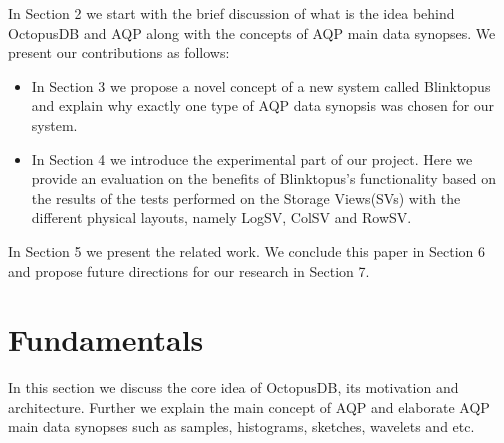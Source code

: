 \documentclass[10pt, conference, compsocconf]{IEEEtran}
\begin{document}
In Section 2 we start with the brief discussion of what is the idea behind OctopusDB and AQP along with the concepts of AQP main data synopses. We present our contributions as follows:
\begin{itemize}
\vspace{0.05 cm}
\item{In Section 3 we propose a novel concept of a new system called Blinktopus and explain why exactly one type of AQP data synopsis was chosen for our system.}
\item{In Section 4 we introduce the experimental part of our project. Here we provide an evaluation on the benefits of Blinktopus's functionality based on the results of the tests performed on the Storage Views(SVs) with the different physical layouts, namely LogSV, ColSV and RowSV.}
\end{itemize}
In Section 5 we present the related work. We conclude this paper in Section 6 and propose future directions for our research in Section 7.

\section{Fundamentals}
In this section we discuss the core idea of OctopusDB, its motivation and  architecture. Further we explain the main concept of AQP and elaborate AQP main data synopses such as samples, histograms, sketches, wavelets and etc.
\end{document}
